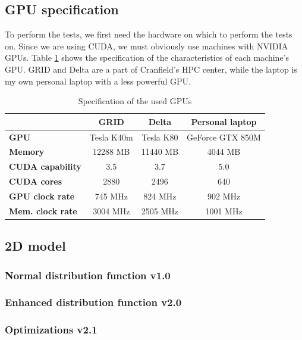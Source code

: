 \documentclass[12pt]{book}
\begin{document}
\subsection{GPU specification}
To perform the tests, we first need the hardware on which to perform the tests on. Since we are using CUDA, we must obviously use machines with NVIDIA GPUs. Table \ref{tab:specs} shows the specification of the characteristics of each machine's GPU. GRID and Delta are a part of Cranfield's HPC center, while the laptop is my own personal laptop with a less powerful GPU.
\begin{table}[H]
	\centering
	\begin{tabular}{|l|c|c|c|}
		\hline
		\multicolumn{1}{|c|}{\textbf{}} & \textbf{GRID} & \textbf{Delta} & \textbf{Personal laptop} \\ \hline
		\textbf{GPU}                    & Tesla K40m    & Tesla K80      & GeForce GTX 850M         \\ \hline
		\textbf{Memory}                 & 12288 MB      & 11440 MB       & 4044 MB                  \\ \hline
		\textbf{CUDA capability}        & 3.5           & 3.7            & 5.0                       \\ \hline
		\textbf{CUDA cores}             & 2880          & 2496           & 640                      \\ \hline
		\textbf{GPU clock rate}         & 745 MHz       & 824 MHz        & 902 MHz                  \\ \hline
		\textbf{Mem. clock rate}        & 3004 MHz      & 2505 MHz       & 1001 MHz                 \\ \hline
	\end{tabular}
	\caption{Specification of the used GPUs}
	\label{tab:specs}
\end{table}
\subsection{2D model}
\subsubsection{Normal distribution function v1.0}
\subsubsection{Enhanced distribution function v2.0}
\subsubsection{Optimizations v2.1}
\end{document}
